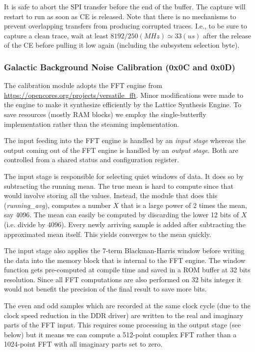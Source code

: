 \documentclass[a4paper,indent]{paper}
\begin{document}
It is safe to abort the \ac{SPI} transfer before the end of the buffer. The capture will restart to run as soon as CE is released. Note that there is no mechanisms to prevent overlapping transfers from producing corrupted traces. I.e., to be sure to capture a clean trace, wait at least $8192/250 (MHz) \simeq 33 (us)$ after the release of the CE before pulling it low again (including the subsystem selection byte).

\subsubsection{Galactic Background Noise Calibration (0x0C and 0x0D)}
The calibration module adopts the \acs{FFT} engine from \url{https://opencores.org/projects/versatile_fft}. Minor modifications were made to the engine to make it synthesize efficiently by the Lattice Synthesis Engine. To save resources (mostly RAM blocks) we employ the single-butterfly implementation rather than the steaming implementation. 

The input feeding into the FFT engine is handled by an \emph{input stage} whereas the output coming out of the FFT engine is handled by an \emph{output stage}. Both are controlled from a shared status and configuration register.

The input stage is responsible for selecting quiet windows of data. It does so by subtracting the running mean. The true mean is hard to compute since that would involve storing all the values. Instead, the module that does this (\emph{running\_avg}), computes a number $X$ that is a large power of 2 times the mean, say 4096. The mean can easily be computed by discarding the lower 12 bits of $X$ (i.e. divide by 4096). Every newly arriving sample is added after subtracting the approximated mean itself. This yields converges to the mean quickly.

The input stage also applies the 7-term Blackman-Harris window before writing the data into the memory block that is internal to the FFT engine. The window function gets pre-computed at compile time and saved in a ROM buffer at 32 bits resolution. Since all FFT computations are also performed on 32 bits integer it would not benefit the precision of the final result to save more bits. 

The even and odd samples which are recorded at the same clock cycle (due to the clock speed reduction in the DDR driver) are written to the real and imaginary parts of the FFT input. This requires some processing in the output stage (see below) but it means we can compute a 512-point complex FFT rather than a 1024-point FFT with all imaginary parts set to zero.
\end{document}
